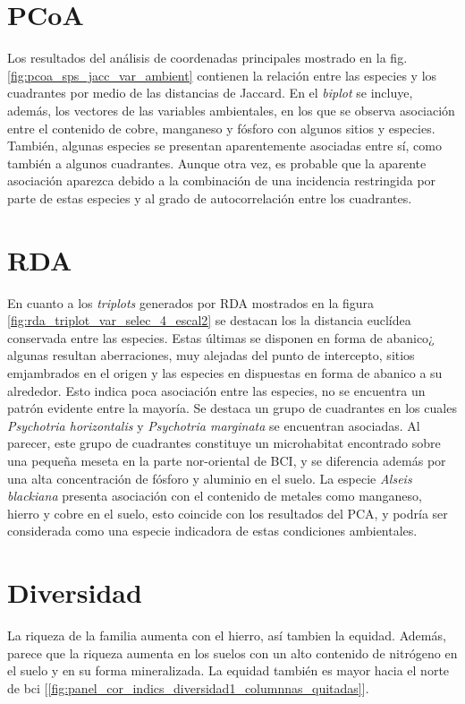 \documentclass[11pt,]{article}
\begin{document}
\section{PCoA}\label{pcoa}

Los resultados del análisis de coordenadas principales mostrado en la
fig. \ref{fig:pcoa_sps_jacc_var_ambient} contienen la relación entre las
especies y los cuadrantes por medio de las distancias de Jaccard. En el
\emph{biplot} se incluye, además, los vectores de las variables
ambientales, en los que se observa asociación entre el contenido de
cobre, manganeso y fósforo con algunos sitios y especies. También,
algunas especies se presentan aparentemente asociadas entre sí, como
también a algunos cuadrantes. Aunque otra vez, es probable que la
aparente asociación aparezca debido a la combinación de una incidencia
restringida por parte de estas especies y al grado de autocorrelación
entre los cuadrantes.

\section{RDA}\label{rda}

En cuanto a los \emph{triplots} generados por RDA mostrados en la figura
\ref{fig:rda_triplot_var_selec_4_escal2} se destacan los la distancia
euclídea conservada entre las especies. Estas últimas se disponen en
forma de abanico¿ algunas resultan aberraciones, muy alejadas del punto
de intercepto, sitios emjambrados en el origen y las especies en
dispuestas en forma de abanico a su alrededor. Esto indica poca
asociación entre las especies, no se encuentra un patrón evidente entre
la mayoría. Se destaca un grupo de cuadrantes en los cuales
\emph{Psychotria horizontalis} y \emph{Psychotria marginata} se
encuentran asociadas. Al parecer, este grupo de cuadrantes constituye un
microhabitat encontrado sobre una pequeña meseta en la parte
nor-oriental de BCI, y se diferencia además por una alta concentración
de fósforo y aluminio en el suelo. La especie \emph{Alseis blackiana}
presenta asociación con el contenido de metales como manganeso, hierro y
cobre en el suelo, esto coincide con los resultados del PCA, y podría
ser considerada como una especie indicadora de estas condiciones
ambientales.

\section{Diversidad}\label{diversidad}

La riqueza de la familia aumenta con el hierro, así tambien la equidad.
Además, parece que la riqueza aumenta en los suelos con un alto
contenido de nitrógeno en el suelo y en su forma mineralizada. La
equidad también es mayor hacia el norte de bci
{[}\ref{fig:panel_cor_indics_diversidad1_columnnas_quitadas}{]}.
\end{document}
